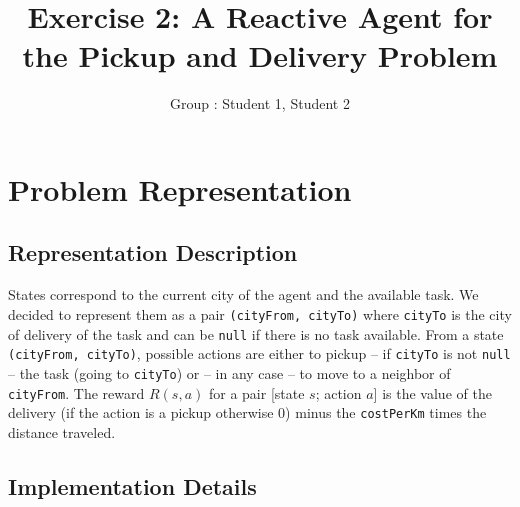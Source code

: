 \documentclass[11pt]{article}
\title{\bf Exercise 2: A Reactive Agent for the Pickup and Delivery Problem}
\author{Group \textnumero: Student 1, Student 2}
\begin{document}
\maketitle

\section{Problem Representation}

\subsection{Representation Description}

States correspond to the current city of the agent and the available task. We decided to represent them as a pair \verb|(cityFrom, cityTo)| where \verb|cityTo| is the city of delivery of the task and can be \verb|null| if there is no task available. From a state \verb|(cityFrom, cityTo)|, possible actions are either to pickup -- if \verb|cityTo| is not \verb|null| -- the task (going to \verb|cityTo|) or -- in any case -- to move to a neighbor of \verb|cityFrom|. The reward $R(s,a)$ for a pair [state $s$; action $a$] is the value of the delivery (if the action is a pickup otherwise 0) minus the \verb|costPerKm| times the distance traveled.

\subsection{Implementation Details}
\end{document}
